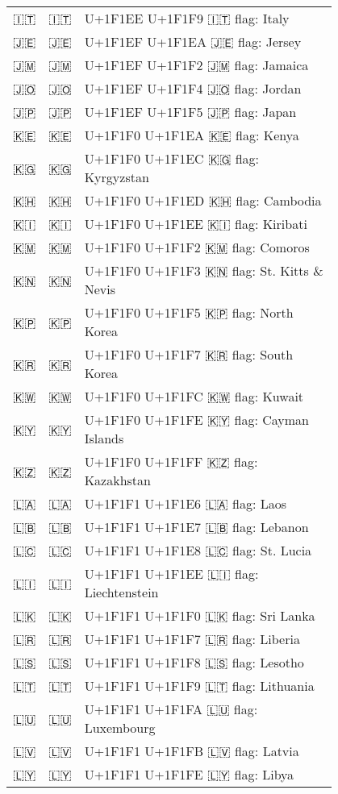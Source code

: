 \documentclass[a4paper,12pt]{ltjarticle}
\newcommand{\fontA}[1]{{\fontspec[RawFeature={mode=harf,+dist,+ccmp}]{Segoe UI Emoji} #1}}
\newcommand{\fontB}[1]{{\fontspec[RawFeature={mode=harf,+dist,+ccmp}]{Noto Color Emoji} #1}}
\begin{document}
\begin{longtable}[c]{ccp{0.8\linewidth}}
\fontA{🇮🇹}&\fontB{🇮🇹}&U+1F1EE U+1F1F9 🇮🇹 flag: Italy\\
\fontA{🇯🇪}&\fontB{🇯🇪}&U+1F1EF U+1F1EA 🇯🇪 flag: Jersey\\
\fontA{🇯🇲}&\fontB{🇯🇲}&U+1F1EF U+1F1F2 🇯🇲 flag: Jamaica\\
\fontA{🇯🇴}&\fontB{🇯🇴}&U+1F1EF U+1F1F4 🇯🇴 flag: Jordan\\
\fontA{🇯🇵}&\fontB{🇯🇵}&U+1F1EF U+1F1F5 🇯🇵 flag: Japan\\
\fontA{🇰🇪}&\fontB{🇰🇪}&U+1F1F0 U+1F1EA 🇰🇪 flag: Kenya\\
\fontA{🇰🇬}&\fontB{🇰🇬}&U+1F1F0 U+1F1EC 🇰🇬 flag: Kyrgyzstan\\
\fontA{🇰🇭}&\fontB{🇰🇭}&U+1F1F0 U+1F1ED 🇰🇭 flag: Cambodia\\
\fontA{🇰🇮}&\fontB{🇰🇮}&U+1F1F0 U+1F1EE 🇰🇮 flag: Kiribati\\
\fontA{🇰🇲}&\fontB{🇰🇲}&U+1F1F0 U+1F1F2 🇰🇲 flag: Comoros\\
\fontA{🇰🇳}&\fontB{🇰🇳}&U+1F1F0 U+1F1F3 🇰🇳 flag: St. Kitts \& Nevis\\
\fontA{🇰🇵}&\fontB{🇰🇵}&U+1F1F0 U+1F1F5 🇰🇵 flag: North Korea\\
\fontA{🇰🇷}&\fontB{🇰🇷}&U+1F1F0 U+1F1F7 🇰🇷 flag: South Korea\\
\fontA{🇰🇼}&\fontB{🇰🇼}&U+1F1F0 U+1F1FC 🇰🇼 flag: Kuwait\\
\fontA{🇰🇾}&\fontB{🇰🇾}&U+1F1F0 U+1F1FE 🇰🇾 flag: Cayman Islands\\
\fontA{🇰🇿}&\fontB{🇰🇿}&U+1F1F0 U+1F1FF 🇰🇿 flag: Kazakhstan\\
\fontA{🇱🇦}&\fontB{🇱🇦}&U+1F1F1 U+1F1E6 🇱🇦 flag: Laos\\
\fontA{🇱🇧}&\fontB{🇱🇧}&U+1F1F1 U+1F1E7 🇱🇧 flag: Lebanon\\
\fontA{🇱🇨}&\fontB{🇱🇨}&U+1F1F1 U+1F1E8 🇱🇨 flag: St. Lucia\\
\fontA{🇱🇮}&\fontB{🇱🇮}&U+1F1F1 U+1F1EE 🇱🇮 flag: Liechtenstein\\
\fontA{🇱🇰}&\fontB{🇱🇰}&U+1F1F1 U+1F1F0 🇱🇰 flag: Sri Lanka\\
\fontA{🇱🇷}&\fontB{🇱🇷}&U+1F1F1 U+1F1F7 🇱🇷 flag: Liberia\\
\fontA{🇱🇸}&\fontB{🇱🇸}&U+1F1F1 U+1F1F8 🇱🇸 flag: Lesotho\\
\fontA{🇱🇹}&\fontB{🇱🇹}&U+1F1F1 U+1F1F9 🇱🇹 flag: Lithuania\\
\fontA{🇱🇺}&\fontB{🇱🇺}&U+1F1F1 U+1F1FA 🇱🇺 flag: Luxembourg\\
\fontA{🇱🇻}&\fontB{🇱🇻}&U+1F1F1 U+1F1FB 🇱🇻 flag: Latvia\\
\fontA{🇱🇾}&\fontB{🇱🇾}&U+1F1F1 U+1F1FE 🇱🇾 flag: Libya\\

\end{longtable}
\end{document}
